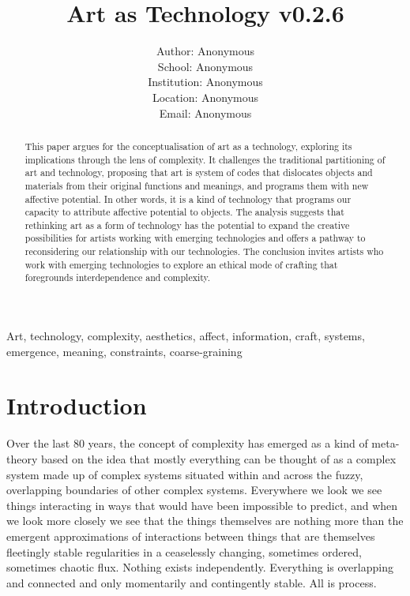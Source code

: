 \documentclass[letterpaper]{article}
\title{Art as Technology v0.2.6}
\author{Author: Anonymous\\
School: Anonymous\\
Institution: Anonymous\\
Location: Anonymous\\
Email: Anonymous\\
\newline
\newline
}
\begin{document}
 
\maketitle
\begin{abstract}

    This paper argues for the conceptualisation of art as a technology, exploring its implications through the lens of complexity. It challenges the traditional partitioning of art and technology, proposing that art is system of codes that dislocates objects and materials from their original functions and meanings, and programs them with new affective potential. In other words, it is a kind of technology that programs our capacity to attribute affective potential to objects. The analysis suggests that rethinking art as a form of technology has the potential to expand the creative possibilities for artists working with emerging technologies and offers a pathway to reconsidering our relationship with our technologies. The conclusion invites artists who work with emerging technologies to explore an ethical mode of crafting that foregrounds interdependence and complexity.

\end{abstract}


Art, technology, complexity, aesthetics, affect, information, craft, systems, emergence, meaning, constraints, coarse-graining

\section{Introduction}

    Over the last 80 years, the concept of complexity has emerged as a kind of meta-theory based on the idea that mostly everything can be thought of as a complex system made up of complex systems situated within and across the fuzzy, overlapping boundaries of other complex systems. Everywhere we look we see things interacting in ways that would have been impossible to predict, and when we look more closely we see that the things themselves are nothing more than the emergent approximations of interactions between things that are themselves fleetingly stable regularities in a ceaselessly changing, sometimes ordered, sometimes chaotic flux. Nothing exists independently. Everything is overlapping and connected and only momentarily and contingently stable. All is process.
    
\end{document}
